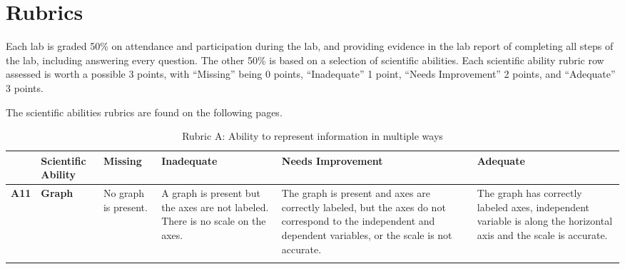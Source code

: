 
\chapter{Rubrics}\label{cha:rubrics}

Each lab is graded 50\% on attendance and participation during the lab, and providing evidence in the lab report of completing all steps of the lab, including answering every question. The other 50\% is based on a selection of scientific abilities. Each scientific ability rubric row assessed is worth a possible 3 points, with ``Missing'' being 0 points, ``Inadequate'' 1 point, ``Needs Improvement'' 2 points, and ``Adequate'' 3 points.

The scientific abilities rubrics are found on the following pages.

\begin{landscape}

\begin{longtable}{>{\bfseries}p{0.04\textheight}|>{\bfseries\RaggedRight}p{0.23\textheight}|>{\RaggedRight}p{0.21\textheight}|>{\RaggedRight}p{0.21\textheight}|>{\RaggedRight}p{0.22\textheight}|>{\RaggedRight}p{0.22\textheight}}
	\toprule
	& Scientific Ability
	& Missing & Inadequate & Needs Improvement & Adequate \\ \midrule \endhead
	A11
	& Graph
	& No graph is present.
	& A graph is present but the axes are not labeled. There is no scale on the axes.
	& The graph is present and axes are correctly labeled, but the axes do not correspond to the independent and dependent variables, or the scale is not accurate.
	& The graph has correctly labeled axes, independent variable is along the horizontal axis and the scale is accurate.
	\\
	\bottomrule
	\caption{Rubric A: Ability to represent information in multiple ways}\label{rubric:a}
	\end{longtable}


\end{landscape}
